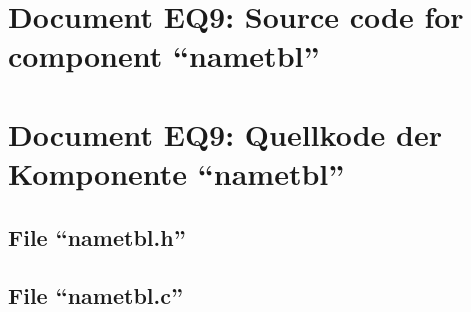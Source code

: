 \parindent0pt
\pagestyle{myheadings}
\ifenglish
{}
\fi
\ifgerman
{}
\fi

\ifenglish
\section*{Document EQ9: Source code for component ``nametbl''}
\fi
\ifgerman
\section*{Document EQ9: Quellkode der Komponente "`nametbl"'}
\fi

\subsection*{File ``nametbl.h''}
\smallskip

\newpage

\subsection*{File ``nametbl.c''}
\smallskip




